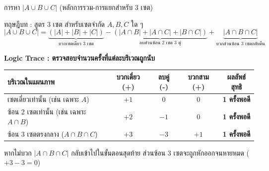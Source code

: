 \begin{frame}{การหา $|A \cup B \cup C|$ (หลักการรวม-การแยกสำหรับ 3 เซต)}
  \begin{block}{ทฤษฎีบท : สูตร 3 เซต}
    สำหรับเซตจำกัด $A, B, C$ ใด ๆ
    \[
      |A \cup B \cup C| = \underbrace{(|A| + |B| + |C|)}_{\text{บวกเซตเดี่ยว 3 เซต}} - \underbrace{(|A \cap B| + |A \cap C| + |B \cap C|)}_{\text{ลบส่วนซ้อน 2 เซต 3 คู่}} + \underbrace{|A \cap B \cap C|}_{\text{บวกส่วนซ้อน 3 เซตกลับคืน}}
    \]
  \end{block}
  \vspace{0.2em}
  \textbf{Logic Trace : ตรวจสอบจำนวนครั้งที่แต่ละบริเวณถูกนับ}
  \begin{center}\small
  \begin{tabular}{|l|c|c|c|c|}
    \hline
    \textbf{บริเวณในแผนภาพ} & \textbf{บวกเดี่ยว (+)} & \textbf{ลบคู่ (-)} & \textbf{บวกสาม (+)} & \textbf{ผลลัพธ์สุทธิ} \\ \hline
    เซตเดี่ยวเท่านั้น (เช่น เฉพาะ $A$) & $+1$ & $0$ & $0$ & \textbf{1 ครั้งพอดี} \\ \hline
    ซ้อน 2 เซตเท่านั้น (เช่น เฉพาะ $A \cap B$) & $+2$ & $-1$ & $0$ & \textbf{1 ครั้งพอดี} \\ \hline
    ซ้อน 3 เซตตรงกลาง ($A \cap B \cap C$) & $+3$ & $-3$ & $+1$ & \textbf{1 ครั้งพอดี} \\ \hline
  \end{tabular}
  \end{center}
  \vspace{0.1em}
  \footnotesize หากไม่บวก $|A \cap B \cap C|$ กลับเข้าไปในขั้นตอนสุดท้าย ส่วนซ้อน 3 เซตจะถูกหักออกจนหายหมด ($+3 - 3 = 0$)
\end{frame}

